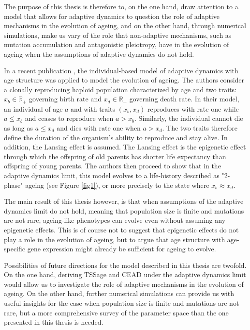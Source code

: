\documentclass[11pt, a4paper]{article}
\theoremstyle{definition}
\begin{document}
    The purpose of this thesis is therefore to, on the one hand, draw attention to a model that allows for adaptive dynamics to question the role of adaptive mechanisms in the evolution of ageing, and on the other hand, through numerical simulations, make us vary of the role that non-adaptive mechanisms, such as mutation accumulation and antagonistic pleiotropy, have in the evolution of ageing when the assumptions of adaptive dynamics do not hold.

    In a recent publication \autocite{meleard2018bd}, the individual-based model of adaptive dynamics with age structure was applied to model the evolution of ageing. The authors consider a clonally reproducing haploid population characterized by age and two traits: $x_b\in \mathbb{R}_+$ governing birth rate and $x_d\in \mathbb{R}_+$ governing death rate. In their model, an individual of age $a$ and with traits $(x_b,x_d)$ reproduces with rate one while $a\leq x_b$ and ceases to reproduce when $a>x_b$.
    Similarly, the individual cannot die as long as $a\leq x_d$ and dies with rate one when $a>x_d$. The two traits therefore define the duration of the organism's ability to reproduce and stay alive.
    In addition, the Lansing effect is assumed. The Lansing effect is the epigenetic effect through which the offspring of old parents has shorter life expectancy than offspring of young parents.
    The authors then proceed to show that in the adaptive dynamics limit, this model evolves to a life-history described as "2-phase" ageing (see Figure \ref{fig1}), or more precisely to the state where $x_b \approx x_d$.

    The main result of this thesis however, is that when assumptions of the adaptive dynamics limit do not hold, meaning that population size is finite and mutations are not rare, ageing-like phenotypes can evolve even without assuming any epigenetic effects. This is of course not to suggest that epigenetic effects do not play a role in the evolution of ageing, but to argue that age structure with age-specific gene expression might already be sufficient for ageing to evolve.

    Possibilities of future directions for the model described in this thesis are twofold. On the one hand, deriving TSSage and CEAD under the adaptive dynamics limit would allow us to investigate the role of adaptive mechanisms in the evolution of ageing. On the other hand, further numerical simulations can provide us with useful insights for the case when population size is finite and mutations are not rare, but a more comprehensive survey of the parameter space than the one presented in this thesis is needed.
\end{document}
